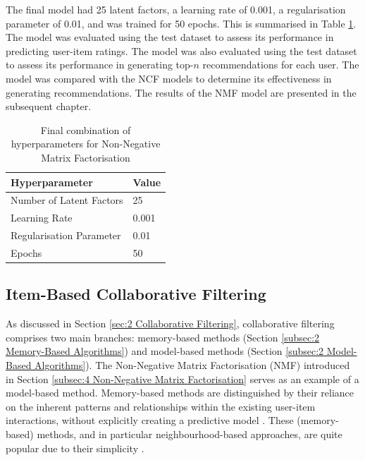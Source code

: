 The final model had 25 latent factors, a learning rate of 0.001, a regularisation parameter of 0.01, and was trained for 50 epochs. This is summarised in Table \ref{hyper_params_mf_final}. The model was evaluated using the test dataset to assess its performance in predicting user-item ratings. The model was also evaluated using the test dataset to assess its performance in generating top-$n$ recommendations for each user. The model was compared with the NCF models to determine its effectiveness in generating recommendations. The results of the NMF model are presented in the subsequent chapter.


\begin{table}[h]
    \centering
    \begin{tabular}{|p{6cm}|p{3cm}|}
    \hline
    \textbf{Hyperparameter} & \textbf{Value}  \\
    \hline
    Number of Latent Factors & 25 \\
    Learning Rate & 0.001 \\
    Regularisation Parameter & 0.01 \\
    Epochs & 50 \\
    \hline
    \end{tabular}
    \caption{Final combination of hyperparameters for Non-Negative Matrix Factorisation}
    \label{hyper_params_mf_final}
    \end{table}



\subsection{Item-Based Collaborative Filtering}
\label{subsec:4 Item-Based Collaborative Filtering}

As discussed in Section \ref{sec:2 Collaborative Filtering}, collaborative filtering comprises two main branches: memory-based methods (Section \ref{subsec:2 Memory-Based Algorithms}) and model-based methods (Section \ref{subsec:2 Model-Based Algorithms}). The Non-Negative Matrix Factorisation (NMF) introduced in Section \ref{subsec:4 Non-Negative Matrix Factorisation} serves as an example of a model-based method. Memory-based methods are distinguished by their reliance on the inherent patterns and relationships within the existing user-item interactions, without explicitly creating a predictive model \cite{sarwar2001item}. These (memory-based) methods, and in particular neighbourhood-based approaches, are quite popular due to their simplicity \cite{herlocker2004evaluating}.

